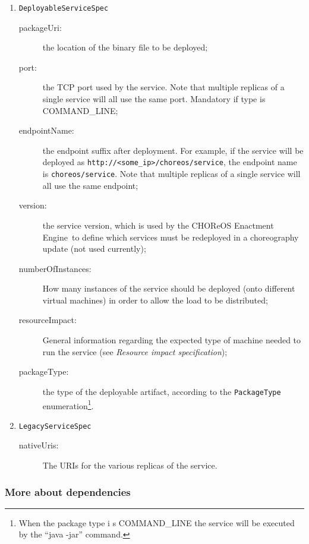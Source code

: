 \documentclass[a4paper, 10pt]{article}
\newcommand{\ee}{CHOReOS Enactment Engine}
\begin{document}
\begin{enumerate}
\item \verb!DeployableServiceSpec!
	\begin{description}
		\item [packageUri:] the location of the binary file to be deployed;
		\item [port:] the TCP port used by the service. Note that multiple replicas of a single service will all use the same port. Mandatory if type is COMMAND\_LINE;
		\item [endpointName:] the endpoint suffix after deployment. For example, if the service will be deployed as \verb!http://<some_ip>/choreos/service!, the endpoint name is \verb!choreos/service!. Note that multiple replicas of a single service will all use the same endpoint;
		\item [version:] the service version, which is used by the \ee\ to define which services must be redeployed in a choreography update (not used currently);
		\item [numberOfInstances:] How many instances of the service should be deployed (onto different virtual machines) in order to allow the load to be distributed;
		\item [resourceImpact:] General information regarding the expected type of machine needed to run the service (see \emph{Resource impact specification});
		\item [packageType:] the type of the deployable artifact, according to the \verb!PackageType! enumeration\footnote{When the package type i    s COMMAND\_LINE the service will be executed by the ``java -jar'' command.}.
	\end{description}

\item \verb!LegacyServiceSpec!
	\begin{description}
		\item [nativeUris:] The URIs for the various replicas of the service.
	\end{description}

\end{enumerate}

\subsubsection*{More about dependencies}
\end{document}
